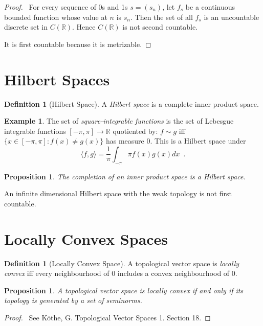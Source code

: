 \documentclass{book}
\let\qed\relax
\newtheorem{prop}[ax]{Proposition}
\theoremstyle{definition}
\newtheorem{df}[ax]{Definition}
\newtheorem{ex}[ax]{Example}
\begin{document}
\begin{proof}
\pf\ For every sequence of 0s and 1s $s = (s_n)$, let $f_s$ be a continuous bounded function whose value at $n$ is $s_n$. Then the set of all $f_s$ is an uncountable discrete set in $C(\mathbb{R})$. Hence $C(\mathbb{R})$ is not second countable.

It is first countable because it is metrizable. \qed
\end{proof}

\section{Hilbert Spaces}

\begin{df}[Hilbert Space]
A \emph{Hilbert space} is a complete inner product space.
\end{df}

\begin{ex}
The set of \emph{square-integrable functions} is the set of Lebesgue integrable functions $[-\pi,\pi] \rightarrow \mathbb{R}$ quotiented by: $f \sim g$ iff $\{ x \in [-\pi,\pi] : f(x) \neq g(x) \}$ has measure 0. This is a Hilbert space under
\[ \langle f,g \rangle = \frac{1}{\pi} \int_{- \pi}{\pi} f(x) g(x) dx \enspace . \]
\end{ex}

\begin{prop}
The completion of an inner product space is a Hilbert space.
\end{prop}

An infinite dimensional Hilbert space with the weak topology is not first countable.

\section{Locally Convex Spaces}

\begin{df}[Locally Convex Space]
A topological vector space is \emph{locally convex} iff every neighbourhood of 0 includes a convex neighbourhood of 0.
\end{df}

\begin{prop}
A topological vector space is locally convex if and only if its topology is generated by a set of seminorms.
\end{prop}

\begin{proof}
\pf\ See K\"{o}the, G. Topological Vector Spaces 1. Section 18. \qed
\end{proof}
\end{document}
